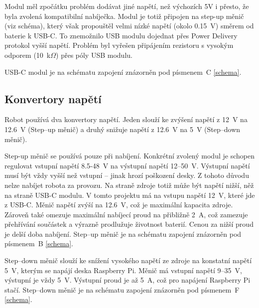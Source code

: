 Modul měl zpočátku problém dodávat jiné napětí, než výchozích 5V i přesto, že byla zvolená kompatibilní nabíječka. Modul je totiž připojen na step-up měnič (viz schéma), který však propouštěl velmi nízké napětí (okolo 0.15~V) směrem od baterie k USB-C. To znemožnilo USB modulu dojednat přes Power Delivery protokol vyšší napětí. Problém byl vyřešen připájením rezistoru s vysokým odporem (10~k$\Omega$) přes póly USB modulu.

USB-C modul je na schématu zapojení znázorněn pod písmenem~C \ref{schema}.

\subsection*{Konvertory napětí}
Robot používá dva konvertory napětí. Jeden slouží ke zvýšení napětí z 12~V na 12.6~V (Step--up měnič) a druhý snižuje napětí z 12.6~V na 5~V (Step--down měnič).

Step-up měnič se používá pouze při nabíjení. Konkrétní zvolený modul je schopen regulovat vstupní napětí 8.5-48~V na výstupní napětí 12--50~V. Výstupní napětí musí být vždy vyšší než vstupní -- jinak hrozí poškození desky. Z tohoto důvodu nelze nabíjet robota za provozu. Na straně zdroje totiž může být napětí nižší, něž na straně USB-C modulu. V tomto projektu má na vstupu napětí 12~V, které jde z USB-C. Měnič napětí zvýší na 12.6~V, což je maximální kapacita zdroje. Zároveň také omezuje maximální nabíjecí proud na přibližně 2~A, což zamezuje přehřívání součástek a výrazně prodlužuje životnost baterií. \cite{bat_life} Cenou za nižší proud je delší doba nabíjení. Step--up měnič je na schématu zapojení znázorněn pod písmenem~B \ref{schema}.



Step--down měnič slouží ke snížení vysokého napětí ze zdroje na konstatní napětí 5~V, kterým se napájí deska Raspberry Pi. Měnič má vstupní napětí 9--35~V, výstupní je vždy 5~V. Výstupní proud je až 5~A, což pro napájení Raspberry Pi stačí. Step--down měnič je na schématu zapojení znázorněn pod písmenem~F \ref{schema}.

